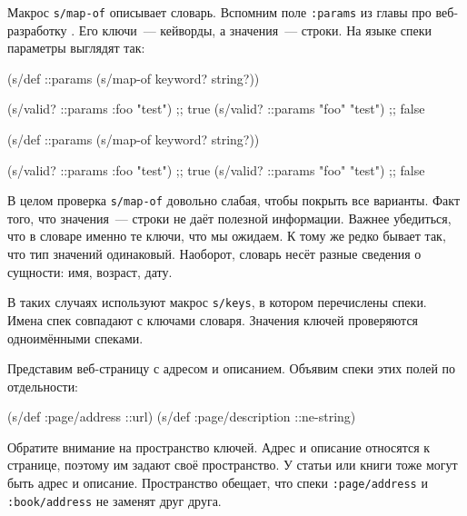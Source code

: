 
Макрос \verb|s/map-of| описывает словарь. Вспомним поле \verb|:params| из
главы про веб-разработку . Его ключи~--- кейворды, а значения~---
строки. На языке спеки параметры выглядят так:

\ifx\DEVICETYPE\MOBILE

\begin{english}
  \begin{clojure}
(s/def ::params
  (s/map-of keyword? string?))

(s/valid? ::params
  {:foo "test"})  ;; true
(s/valid? ::params
  {"foo" "test"}) ;; false
  \end{clojure}
\end{english}

\else

\begin{english}
  \begin{clojure}
(s/def ::params
  (s/map-of keyword? string?))

(s/valid? ::params {:foo "test"})  ;; true
(s/valid? ::params {"foo" "test"}) ;; false
  \end{clojure}
\end{english}

\fi

В целом проверка \verb|s/map-of| довольно слабая, чтобы покрыть все
варианты. Факт того, что значения~--- строки не даёт полезной информации. Важнее
убедиться, что в словаре именно те ключи, что мы ожидаем. К тому же редко бывает
так, что тип значений одинаковый. Наоборот, словарь несёт разные сведения о
сущности: имя, возраст, дату.


В таких случаях используют макрос \verb|s/keys|, в котором перечислены
спеки. Имена спек совпадают с ключами словаря. Значения ключей проверяются
одноимёнными спеками.

Представим веб-страницу с адресом и описанием. Объявим спеки этих полей по
отдельности:

\begin{english}
  \begin{clojure}
(s/def :page/address ::url)
(s/def :page/description ::ne-string)
  \end{clojure}
\end{english}


Обратите внимание на пространство ключей. Адрес и описание относятся к странице,
поэтому им задают своё пространство. У статьи или книги тоже могут быть адрес и
описание. Пространство обещает, что спеки \verb|:page/address| и
\verb|:book/address| не заменят друг друга.

